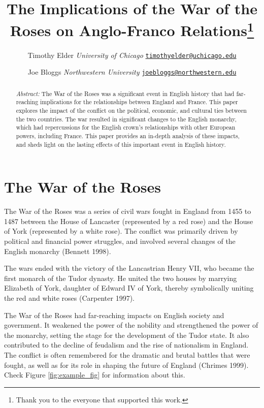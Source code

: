 \documentclass[11pt,article,oneside]{memoir}
\title{\bigskip \bigskip The Implications of the War of the Roses on
Anglo-Franco Relations\thanks{Thank you to the everyone that supported
this work.}  }
\author{\Large Timothy
Elder\vspace{0.05in} \newline\normalsize\emph{University of
Chicago} \newline\footnotesize \texttt{\href{mailto:timothyelder@uchicago.edu}{timothyelder@uchicago.edu}}\vspace*{0.2in}\newline  \and \Large Joe
Bloggs\vspace{0.05in} \newline\normalsize\emph{Northwestern
University} \newline\footnotesize \texttt{\href{mailto:joebloggs@northwestern.edu}{joebloggs@northwestern.edu}}\vspace*{0.2in}\newline }
\date{}
\begin{document}
  
\pagestyle{kjh}


\maketitle



\begin{abstract}

\vspace*{-0.75in}\noindent \emph{Abstract:} The War of the Roses was a
significant event in English history that had far-reaching implications
for the relationships between England and France. This paper explores
the impact of the conflict on the political, economic, and cultural ties
between the two countries. The war resulted in significant changes to
the English monarchy, which had repercussions for the English crown's
relationships with other European powers, including France. This paper
provides an in-depth analysis of these impacts, and sheds light on the
lasting effects of this important event in English history.

\end{abstract}


\hypertarget{the-war-of-the-roses}{%
\section{The War of the Roses}\label{the-war-of-the-roses}}

The War of the Roses was a series of civil wars fought in England from
1455 to 1487 between the House of Lancaster (represented by a red rose)
and the House of York (represented by a white rose). The conflict was
primarily driven by political and financial power struggles, and
involved several changes of the English monarchy (Bennett 1998).

The wars ended with the victory of the Lancastrian Henry VII, who became
the first monarch of the Tudor dynasty. He united the two houses by
marrying Elizabeth of York, daughter of Edward IV of York, thereby
symbolically uniting the red and white roses (Carpenter 1997).

The War of the Roses had far-reaching impacts on English society and
government. It weakened the power of the nobility and strengthened the
power of the monarchy, setting the stage for the development of the
Tudor state. It also contributed to the decline of feudalism and the
rise of nationalism in England. The conflict is often remembered for the
dramatic and brutal battles that were fought, as well as for its role in
shaping the future of England (Chrimes 1999). Check Figure
\ref{fig:example_fig} for information about this.
\end{document}
